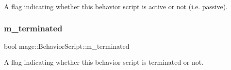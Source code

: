 A flag indicating whether this behavior script is active or not (i.\+e. passive). \hypertarget{classmage_1_1_behavior_script_abc4a0e6728787347012404a597ab8e07}{}\label{classmage_1_1_behavior_script_abc4a0e6728787347012404a597ab8e07} 
\subsubsection{\texorpdfstring{m\+\_\+terminated}{m\_terminated}}
{\footnotesize\ttfamily bool mage\+::\+Behavior\+Script\+::m\+\_\+terminated\hspace{0.3cm}{\ttfamily [private]}}

A flag indicating whether this behavior script is terminated or not. 